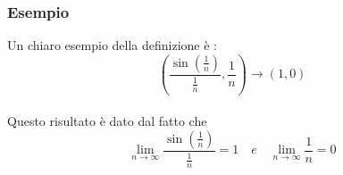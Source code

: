 \documentclass[fontsize = 20px, paper = a4]{article}
\begin{document}
\subsubsection{Esempio}
Un chiaro esempio della definizione è :
$$\left( \frac{\sin\left(\frac{1}{n}\right)}{\frac{1}{n}},\frac{1}{n}\right) \longrightarrow \left(1,0\right)$$ \\ 
Questo risultato è dato dal fatto che 
$$\lim_{n \to \infty} \frac{\sin\left(\frac{1}{n}\right)}{\frac{1}{n}} = 1 \quad e \quad \lim_{n \to \infty}\frac{1}{n} = 0$$
\end{document}

